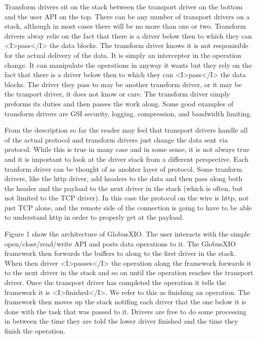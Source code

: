 \documentclass[11pt]{article}
\begin{document}
Transform drivers sit on the stack between the transport driver on the
bottom and the user API on the top.  There can be any number of transport
drivers on a stack, although in most cases there will be no more than one or 
two.  Transform drivers alway relie on the fact that there is a driver
below then to which they can <I>pass</I> the data blocks.  The transform
driver knows it is not responisible for the actual delivery of the data.
It is simply an interceptor in the operation change.  It can manipulate
the operations in anyway it wants but they rely on the fact that there is
a driver below then to which they can <I>pass</I> the data blocks.  The 
driver they pass to may be another transform driver, or it may be the
tranport driver, it does not know or care.  The transform driver simply
preforms its duties and then passes the work along.  Some good examples
of transform drivers are GSI security, logging, compression, 
and bandwidth limiting.

From the description so far the reader may feel that transport drivers
handle all of the actual protocol and transform drivers just change the
data sent via protocol.  While this is true in many case and in some
sense, it is not always true and it is important to look at the driver
stack from a different perspective.  Each tranform driver can be 
thought of as anohter layer of protocol.  Some tranform drivers, like the
http driver, add headers to the data and then pass along both the
header and the payload to the next driver in the stack (which is often,
but not limited to the TCP driver).  In this case the protocol on the
wire is http, not just TCP alone, and the remote side of the connection is
going to have to be able to understand http in order to properly get
at the payload.

Figure 1 show the architecture of GlobusXIO.  The user interacts with 
the simple open/close/read/write API and posts data operations to it.
The GlobusXIO framework then forwards the buffers to along to the first
driver in the stack.  When then driver <I>passes</I> the operation along
the framework forwards it to the next driver in the stack and so on
until the operation reaches the transport driver.  Once the transport 
driver has completed the operation it tells the framework it is 
<I>finished</I>.  We refer to this as finishing an operation.  The 
framework then moves up the stack notifing each driver that the 
one below it is done with the task that was passed to it.  Drivers
are free to do some processing in between the time they are told
the lower driver finished and the time they finish the operation.
\end{document}

